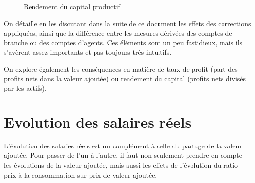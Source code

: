 \documentclass[
  french,
  9pt,
  a4paper,
]{article}
\begin{document}
\begin{figure}[H]

\caption{\label{fig-rp}Rendement du capital productif}


\end{figure}%

On détaille en les discutant dans la suite de ce document les effets des
corrections appliquées, ainsi que la différence entre les mesures
dérivées des comptes de branche ou des comptes d'agents. Ces éléments
sont un peu fastidieux, mais ils s'avèrent assez importants et pas
toujours très intuitifs.

On explore également les conséquences en matière de taux de profit (part
des profits nets dans la valeur ajoutée) ou rendement du capital
(profits nets divisés par les actifs).

\section{Evolution des salaires
réels}\label{evolution-des-salaires-ruxe9els}

L'évolution des salaries réels est un complément à celle du partage de
la valeur ajoutée. Pour passer de l'un à l'autre, il faut non seulement
prendre en compte les évolutions de la valeur ajoutée, mais aussi les
effets de l'évolution du ratio prix à la consommation sur prix de valeur
ajoutée.
\end{document}
